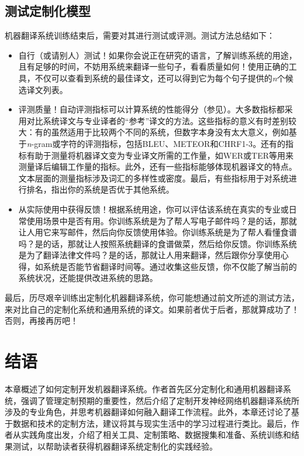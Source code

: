 \documentclass[output=paper]{langscibook}
\begin{document}
  
\subsection{测试定制化模型}
机器翻译系统训练结束后，需要对其进行测试或评测。测试方法总结如下：

\begin{itemize}
\item 自行（或请别人）测试！如果你会说正在研究的语言，了解训练系统的用途，且有足够的时间，不妨用系统来翻译一些句子，看看质量如何！使用正确的工具，不仅可以查看到系统的最佳译文，还可以得到它为每个句子提供的\emph{n}个候选译文列表。

\item 评测质量！自动评测指标可以计算系统的性能得分（参见）。大多数指标都采用对比系统译文与专业译者的“参考”译文的方法。这些指标的意义有时差别较大：有的虽然适用于比较两个不同的系统，但数字本身没有太大意义，例如基于\emph{n}-gram或字符的评测指标，包括BLEU\citep{papineni2002bleu}、METEOR\citep{denkowski:lavie:meteor-wmt:2014}和CHRF1-3\citep{Pop2015}。还有的指标有助于测量将机器译文变为专业译文所需的工作量，如WER\citep{Pop-Ney}或TER\citep{snover-etal-2006-study}等用来测量译后编辑工作量的指标。此外，还有一些指标能够体现机器译文的特点。文本层面的测量指标涉及词汇的多样性或密度。最后，有些指标用于对系统进行排名，指出你的系统是否优于其他系统。

\item 从实际使用中获得反馈！根据系统用途，你可以评估该系统在真实的专业或日常使用场景中是否有用。你训练系统是为了帮人写电子邮件吗？是的话，那就让人用它来写邮件，然后向你反馈使用体验。你训练系统是为了帮人看懂食谱吗？是的话，那就让人按照系统翻译的食谱做菜，然后给你反馈。你训练系统是为了翻译法律文件吗？是的话，那就让人用来翻译，然后跟你分享使用心得，如系统是否能节省翻译时间等。通过收集这些反馈，你不仅能了解当前的系统状况，还能提供改进系统的思路。
\end{itemize}

最后，历尽艰辛训练出定制化机器翻译系统，你可能想通过前文所述的测试方法，来对比自己的定制化系统和通用系统的译文。如果前者优于后者，那就算成功了！否则，再接再厉吧！

\section{结语}
本章概述了如何定制开发机器翻译系统。作者首先区分定制化和通用机器翻译系统，强调了管理定制预期的重要性，然后介绍了定制开发神经网络机器翻译系统所涉及的专业角色，并思考机器翻译如何融入翻译工作流程。此外，本章还讨论了基于数据和技术的定制方法，建议将其与现实生活中的学习过程进行类比。最后，作者从实践角度出发，介绍了相关工具、定制策略、数据搜集和准备、系统训练和结果测试，以帮助读者获得机器翻译系统定制化的实践经验。
\end{document}
